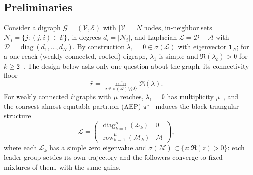 \documentclass[final,5p,times]{elsarticle}
\theoremstyle{plain}
\theoremstyle{definition}
\theoremstyle{remark}
\DeclareMathOperator{\diag}{diag}
\DeclareMathOperator{\row}{row}
\newcommand{\ones}{\mathbf{1}}
\begin{document}
\subsection{Preliminaries}
\label{subsec:prelim}
Consider a digraph $\mathcal{G} = (\mathcal{V}, \mathcal{E})$ with $|\mathcal{V}| = N$ nodes, in-neighbor sets $\mathcal{N}_i = \{j : (j,i) \in \mathcal{E}\}$, in-degrees $d_i = |\mathcal{N}_i|$, and Laplacian $\mathcal{L} = \mathcal{D} - \mathcal{A}$ with $\mathcal{D} = \diag(d_1,\ldots,d_N)$. By construction $\lambda_1 = 0 \in \sigma(\mathcal{L})$ with eigenvector $\ones_N$; for a one-reach (weakly connected, rooted) digraph, $\lambda_1$ is simple and $\Re(\lambda_k) > 0$ for $k \geq 2$~\cite{caughman2006}. The design below asks only one question about the graph, its connectivity floor
\begin{equation}
\bar{r} = \min_{\lambda \in \sigma(\mathcal{L}) \setminus \{0\}} \Re(\lambda).
\label{eq:rbar}
\end{equation}
For weakly connected digraphs with $\mu$ reaches, $\lambda_1 = 0$ has multiplicity $\mu$~\cite{caughman2006}, and the coarsest almost equitable partition (AEP) $\pi^\star$~\cite{monaco2019} induces the block-triangular structure
\begin{equation}
\mathcal{L} = \begin{pmatrix} \diag_{k=1}^{\mu}(\mathcal{L}_k) & 0 \\ \row_{k=1}^{\mu}(\mathcal{M}_k) & \mathcal{M} \end{pmatrix},
\label{eq:L_block}
\end{equation}
where each $\mathcal{L}_k$ has a simple zero eigenvalue and $\sigma(\mathcal{M}) \subset \{z : \Re(z) > 0\}$: each leader group settles its own trajectory and the followers converge to fixed mixtures of them, with the same gains.
\end{document}
